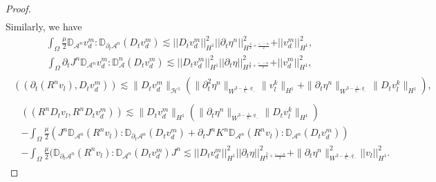\documentclass[letterpaper,reqno,10pt,twoside]{amsart}
\theoremstyle{definition}
\theoremstyle{remark}
\def\p{\partial}
\def\Om{\Omega}
\begin{document}
\begin{proof}
\begin{equation}
\begin{aligned}
			\end{aligned}
		\end{equation}
		Similarly, we have
		\begin{align}
			\int_{\Omega} \frac{\mu}{2}\mathbb{D}_{\mathcal{A}^{n}}v_{d}^{m}:\mathbb{D}_{\partial_{t}\mathcal{A}^{n}}(D_{t}v_{d}^{m})\lesssim\vert \vert D_{t}v_{d}^{m}\vert \vert^{2}_{H^{1}}\vert \vert \partial_{t}\eta^{n}\vert \vert^{2}_{H^{\frac{3}{2}+\frac{\varepsilon_{-}-\alpha}{2}}}+\vert \vert v_{d}^{m}\vert \vert_{H^{1}}^{2},
		\end{align}
		\begin{align}
			\int_{\Omega} \partial_{t}J^{n}\mathbb{D}_{\mathcal{A}^{n}}v_{d}^{m}:\mathbb{D}_{\mathcal{A}}^{n}(D_{t}v_{d}^{m})\lesssim \vert \vert D_{t}v_{d}^{m}\vert \vert^{2}_{H^{1}}\vert \vert \partial_{t}\eta\vert \vert^{2}_{H^{\frac{3}{2}+\frac{\varepsilon_{-}-\alpha}{2}}}+\vert \vert v_{d}^{m}\vert \vert_{H^{1}}^{2},
		\end{align}
		\begin{align}
			\begin{aligned}
				((\p_{t}(R^{n}v_{l}),D_{t}v_{d}^{m}))\lesssim  \|D_{t}v_{d}^{m}\|_{\mathcal{H}^{1}}(\|\p_{t}^{2}\eta^{n}\|_{W^{3-\frac{1}{q_{-}},q_{-}}}\|v_{l}^{k}\|_{H^{1}}+\|\p_{t}\eta^{n}\|_{W^{3-\frac{1}{q_{-}},q_{-}}}\|D_{t}v_{l}^{k}\|_{H^{1}}),
			\end{aligned}
		\end{align}
		\begin{align}
			\begin{aligned}
				&((R^{n}D_{t}v_{l},R^{n}D_{t}v_{d}^{m}))
				\lesssim \|D_{t}v_{d}^{m}\|_{H^{1}}(\|\p_{t}\eta^{n}\|_{W^{3-\frac{1}{q_{-}},q_{-}}}\|D_{t}v_{l}^{k}\|_{H^{1}})\\
				& 
				-\int_\Om\frac{\mu}{2}(J^{n}\mathbb{D}_{\mathcal{A}^{n}}(R^{n}v_{l}):\mathbb{D}_{\p_t\mathcal{A}^{n}}(D_{t}v_{d}^{m})+\p_tJ^{n}K^{n}\mathbb{D}_{\mathcal{A}^{n}}(R^{n}v_{l}):\mathbb{D}_{\mathcal{A}^{n}}(D_{t}v_{d}^{m}))\\
				&-\int_\Om\frac{\mu}{2}(\mathbb{D}_{\p_t\mathcal{A}^{n}}(R^{n}v_{l}):\mathbb{D}_{\mathcal{A}^{n}}(D_{t}v_{d}^{m})J^{n}\lesssim  \vert \vert D_{t}v_{d}^{m}\vert \vert^{2}_{H^{1}}\vert \vert \partial_{t}\eta\vert \vert^{2}_{H^{\frac{3}{2}+\frac{\varepsilon_{-}-\alpha}{2}}}+\|\p_{t}\eta^{n}\|_{W^{3-\frac{1}{q_{-}},q_{-}}}^{2}\vert \vert v_{l}\vert \vert_{H^{1}}^{2}.
			\end{aligned} 
		\end{align}
		

\end{proof}
\end{document}
